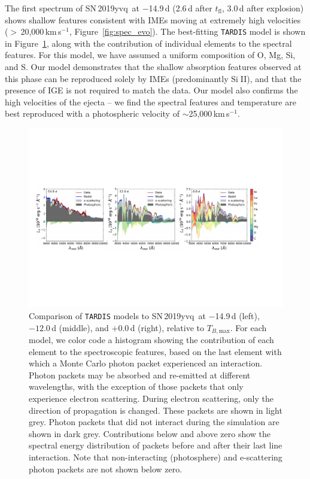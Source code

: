 \documentclass[twocolumn]{aastex63}
\def\ion#1#2{#1$\;${\footnotesize\rm{#2}}\relax}
\newcommand{\tfl}{$t_\mathrm{fl}$}
\newcommand{\tbmax}{$T_{B,\mathrm{max}}$}
\newcommand{\kms}{km\,s$^{-1}$}
\newcommand{\sn}{SN\,2019yvq}
\begin{document}
The first spectrum of \sn\ at $-$14.9\,d (2.6\,d after \tfl, 3.0\,d after
explosion) shows shallow features consistent with IMEs moving at extremely
high velocities ($>$\,20,000\,\kms, Figure~\ref{fig:spec_evo}). The
best-fitting \texttt{TARDIS} model is shown in Figure~\ref{fig:tardis}, along
with the contribution of individual elements to the spectral features. For
this model, we have assumed a uniform composition of O, Mg, Si, and S. Our
model demonstrates that the shallow absorption features observed at this phase
can be reproduced solely by IMEs (predominantly \ion{Si}{II}), and that the
presence of IGE is not required to match the data. Our model also confirms the
high velocities of the ejecta -- we find the spectral features and temperature
are best reproduced with a photospheric velocity of
$\sim$25,000\,\kms.

\begin{figure}
    \centering
    \includegraphics[width=\textwidth]{./figures/tardis.pdf}
    \caption{Comparison of \texttt{TARDIS} models to \sn\ at $-$14.9\,d
    (left), $-12.0$\,d (middle), and $+$0.0\,d (right), relative to \tbmax.
    For each model, we color code a histogram showing the contribution of each
    element to the spectroscopic features, based on the last element with
    which a Monte Carlo photon packet experienced an interaction. Photon
    packets may be absorbed and re-emitted at different wavelengths, with the
    exception of those packets that only experience electron scattering.
    During electron scattering, only the direction of propagation is changed.
    These packets are shown in light grey. Photon packets that did not
    interact during the simulation are shown in dark grey. Contributions below
    and above zero show the spectral energy distribution of packets before and
    after their last line interaction. Note that non-interacting (photosphere)
    and e-scattering photon packets are not shown below zero.}
    \label{fig:tardis}
\end{figure}
\end{document}
